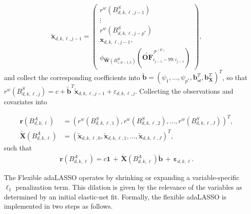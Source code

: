 \documentclass[10pt,a4paper,oneside]{article}
\begin{document}
\[
    \tilde{\mathbf{x}}_{d,k,\ell,j - 1}
    =
    \begin{pmatrix}
        r^w \left( B^S_{d, k, \ell, j - 1} \right)   \\
        \vdots                                       \\
        r^w \left( B^S_{d, k, \ell, j - p^*} \right) \\
        \mathbf{x}_{d, k, \ell, j - 1},              \\
        \phi_{\hat{\mathbf{W}}\left( B^B_{1:d - 1, k} \right)}\left( \widetilde{\mathbf{OF}}^{\mathcal{P}^{(E)}}_{i_{j - 1} - 99:i_{j - 1}} \right)
    \end{pmatrix},
\]
and collect the corresponding coefficients into \(\tilde{\mathbf{b}} = \left( \psi_1, \dots, \psi_{p^*}, \mathbf{b}^T_{\boldsymbol{\omega}}, \mathbf{b}^T_{\mathbf{X}}\right)^T\), so that \(r^w\left( B^S_{d,k,\ell,j} \right) = c + \tilde{\mathbf{b}}^T\tilde{\mathbf{x}}_{d, k, \ell, j - 1} + \varepsilon_{d,k,\ell, j}\). Collecting the observations and covariates into

\begin{align*}
    \mathbf{r}\left( B^A_{d, k, \ell} \right)         & = \left( r^w\left( B^S_{d, k, \ell, 1} \right), r^w\left( B^S_{d, k, \ell, 2}\right), \dots, r^w\left( B^S_{d, k, \ell, J} \right) \right)^T, \\
    \tilde{\mathbf{X}}\left( B^A_{d, k, \ell} \right) & = \left( \tilde{\mathbf{x}}_{d,k,\ell,0}, \tilde{\mathbf{x}}_{d,k,\ell,1}, \dots, \tilde{\mathbf{x}}_{d,k,\ell,J}  \right)^T,
\end{align*}
such that
\begin{align*}
    \mathbf{r}\left( B^A_{d, k, \ell} \right) = c \mathbf{1} \, + \, \tilde{\mathbf{X}}\left( B^A_{d, k, \ell} \right) \tilde{\mathbf{b}} \, + \, \boldsymbol{\varepsilon}_{d, k, \ell}.
\end{align*}


The Flexible adaLASSO operates by shrinking or expanding a variable-specific $\ell_1$ penalization term. This dilation is given by the relevance of the variables as determined by an initial elastic-net fit. Formally, the flexible adaLASSO is implemented in two steps as follows.
\end{document}
